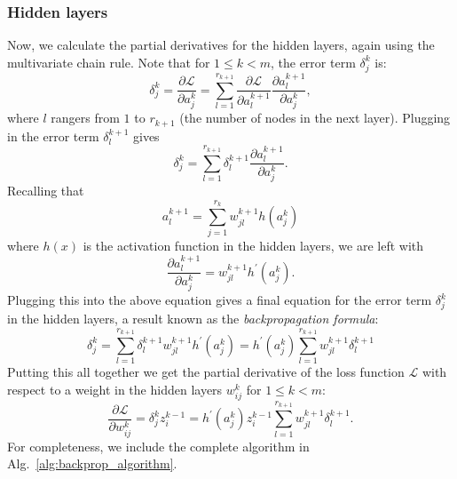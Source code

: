\documentclass[../main.tex]{subfiles}
\begin{document}
\subsubsection{Hidden layers}
Now, we calculate the partial derivatives for the hidden layers, again using the multivariate chain rule.
%
Note that for $1 \leq k < m$, the error term $\delta_{j}^{k}$ is:
%
\begin{equation}
  \delta_{j}^{k} = \frac{\partial\mathcal{L}}{\partial a_{j}^{k}} = \sum_{l=1}^{r_{k+1}}
    \frac{\partial\mathcal{L}}{\partial a_{l}^{k+1}}\frac{\partial a_{l}^{k+1}}{\partial a_{j}^{k}},
\end{equation}
%
where $l$ rangers from $1$ to $r_{k+1}$ (the number of nodes in the next layer).
%
Plugging in the error term $\delta_{l}^{k+1}$ gives
%
\begin{equation}
  \delta_{j}^{k} = \sum_{l=1}^{r_{k+1}} \delta_{l}^{k+1} \frac{\partial a_{l}^{k+1}}{\partial a_{j}^{k}}.
\end{equation}
%
Recalling that
%
\begin{equation}
  a_{l}^{k+1} = \sum_{j=1}^{r_{k}} w_{jl}^{k+1} h(a_{j}^{k})
\end{equation}
%
where $h(x)$ is the activation function in the hidden layers, we are left with
%
\begin{equation}
  \frac{\partial a_{l}^{k+1}}{\partial a_{j}^{k}} = w_{jl}^{k+1} h^{\prime}(a_{j}^{k}).
\end{equation}
%
Plugging this into the above equation gives a final equation for the error term $\delta_{j}^{k}$ in the hidden layers,
a result known as the \emph{backpropagation formula}:
%
\begin{equation}
  \delta_{j}^{k} = \sum_{l=1}^{r_{k+1}} \delta_{l}^{k+1} w_{jl}^{k+1} h^{\prime}(a_{j}^{k}) 
    = h^{\prime}(a_{j}^{k})\sum_{l=1}^{r_{k+1}} w_{jl}^{k+1} \delta_{l}^{k+1}
    \label{eq:hidden_layers}
\end{equation}
%
Putting this all together we get the partial derivative of the loss function $\mathcal{L}$ with respect to a weight in
the hidden layers $w_{ij}^{k}$ for $1 \leq k < m$:
%
\begin{equation}
  \frac{\partial \mathcal{L}}{\partial w_{ij}^{k}} = \delta_{j}^{k} z_{i}^{k-1} = h^{\prime}(a_{j}^{k})z_{i}^{k-1}
    \sum_{l=1}^{r_{k+1}} w_{jl}^{k+1}\delta_{l}^{k+1}.
    \label{eq:loss_terms}
\end{equation}
%
For completeness, we include the complete algorithm in Alg.~\ref{alg:backprop_algorithm}.
\end{document}
